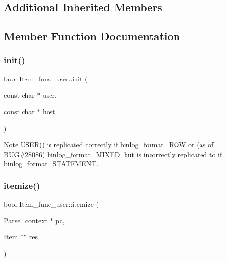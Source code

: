 \subsection*{Additional Inherited Members}


\subsection{Member Function Documentation}
\mbox{\label{classItem__func__user_a11990f518a5f6a600dfc431ded3f0618}} 
\subsubsection{\texorpdfstring{init()}{init()}}
{\footnotesize\ttfamily bool Item\+\_\+func\+\_\+user\+::init (\begin{DoxyParamCaption}\item[{const char $\ast$}]{user,  }\item[{const char $\ast$}]{host }\end{DoxyParamCaption})\hspace{0.3cm}{\ttfamily [protected]}}

\begin{DoxyNote}{Note}
U\+S\+E\+R() is replicated correctly if binlog\+\_\+format=R\+OW or (as of B\+UG\#28086) binlog\+\_\+format=M\+I\+X\+ED, but is incorrectly replicated to \textquotesingle{}\textquotesingle{} if binlog\+\_\+format=S\+T\+A\+T\+E\+M\+E\+NT. 
\end{DoxyNote}
\mbox{\label{classItem__func__user_a3e90c1dfcb5fc3007e8f77e9c3398f93}} 
\subsubsection{\texorpdfstring{itemize()}{itemize()}}
{\footnotesize\ttfamily bool Item\+\_\+func\+\_\+user\+::itemize (\begin{DoxyParamCaption}\item[{\mbox{\hyperlink{structParse__context}{Parse\+\_\+context}} $\ast$}]{pc,  }\item[{\mbox{\hyperlink{classItem}{Item}} $\ast$$\ast$}]{res }\end{DoxyParamCaption})\hspace{0.3cm}{\ttfamily [virtual]}}

